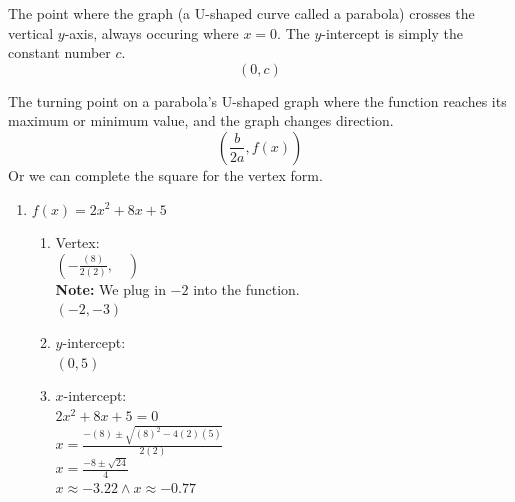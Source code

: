 \begin{definition}[$y$ Intercept]
  The point where the graph (a U-shaped curve called a parabola) crosses the vertical $y$-axis, always occuring where $x = 0$. The $y$-intercept is simply the constant number $c$.
  $$(0, c)$$
\end{definition}
\begin{definition}[Vertex]
  The turning point on a parabola's U-shaped graph where the function reaches its maximum or minimum value, and the graph changes direction.
  $$\left(\frac{b}{2a}, f(x)\right)$$
  Or we can complete the square for the vertex form.
\end{definition}
\begin{example}
  \hfill
  \begin{enumerate}
  \item $f(x) = 2x^2 + 8x + 5$
    \begin{enumerate}
    \item Vertex: \\
      $\left(-\frac{(8)}{2(2)}, \quad \right)$ \\
      \textbf{Note: }We plug in $-2$ into the function. \\
      $(-2, -3)$
    \item $y$-intercept: \\
      $(0, 5)$
    \item $x$-intercept: \\
      $2x^2 + 8x + 5 = 0$ \\
      $x = \frac{-(8) \pm \sqrt{(8)^2 - 4 (2)(5)}}{2(2)}$ \\
      $x = \frac{-8 \pm \sqrt{24}}{4}$ \\
      $x \approx -3.22 \land x \approx -0.77$
    \end{enumerate}
    \begin{center}
\end{center}
\end{enumerate}
\end{example}
